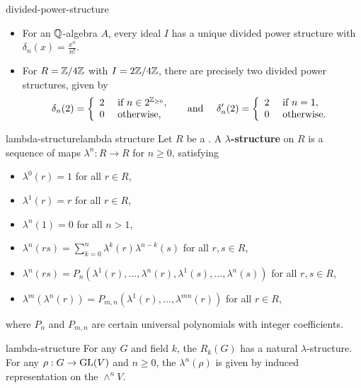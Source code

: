 \begin{example}{divided-power-structure}
    \begin{itemize}
        \item For an $\mathbb{Q}$-algebra $A$, every ideal $I$ has a unique divided power structure with $\delta_n(x) = \frac{x^n}{n!}$.
        \item For $R = \mathbb{Z}/4\mathbb{Z}$ with $I = 2\mathbb{Z}/4\mathbb{Z}$, there are precisely two divided power structures, given by
        \[ \delta_n(2) = \left\{ \begin{array}{cl} 2 & \textup{ if } n \in 2^{\mathbb{Z}_{\ge 0}} , \\ 0 & \textup{ otherwise,} \end{array} \right. \quad \textup{ and } \quad \delta'_n(2) = \left\{ \begin{array}{cl} 2 & \textup{ if } n = 1 , \\ 0 & \textup{ otherwise.} \end{array} \right. \]
    \end{itemize}
\end{example}

\begin{topic}{lambda-structure}{lambda structure}
    Let $R$ be a . A \textbf{$\lambda$-structure} on $R$ is a sequence of maps $\lambda^n : R \to R$ for $n \ge 0$, satisfying
    \begin{itemize}
        \item $\lambda^0(r) = 1$ for all $r \in R$,
        \item $\lambda^1(r) = r$ for all $r \in R$,
        \item $\lambda^n(1) = 0$ for all $n > 1$,
        \item $\lambda^{n}(rs) = \sum_{k = 0}^{n} \lambda^k(r) \lambda^{n - k}(s)$ for all $r, s \in R$,
        \item $\lambda^n(rs) = P_n(\lambda^1(r), \ldots, \lambda^n(r), \lambda^1(s), \ldots,  \lambda^n(s))$ for all $r, s \in R$,
        \item $\lambda^m(\lambda^n(r)) = P_{m, n}(\lambda^1(r), \ldots, \lambda^{mn}(r))$ for all $r \in R$,
    \end{itemize}
    where $P_n$ and $P_{m, n}$ are certain universal polynomials with integer coefficients.
\end{topic}

\begin{example}{lambda-structure}
    For any  $G$ and field $k$, the  $R_k(G)$ has a natural $\lambda$-structure. For any  $\rho : G \to \textup{GL}(V)$ and $n \ge 0$, the $\lambda^n(\rho)$ is given by induced representation on the  $\wedge^n V$.
\end{example}

